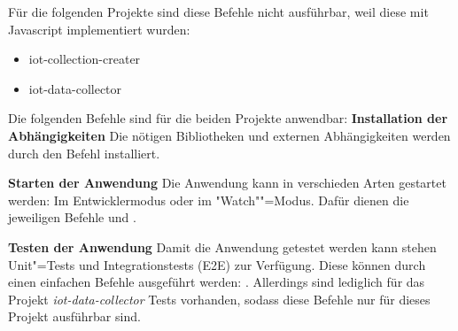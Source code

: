 Für die folgenden Projekte sind diese Befehle nicht ausführbar, weil diese mit Javascript implementiert wurden: 
\begin{itemize}
	\item iot-collection-creater
	\item iot-data-collector
\end{itemize}
Die folgenden Befehle sind für die beiden Projekte anwendbar: \newline
\textbf{Installation der Abhängigkeiten} \newline
Die nötigen Bibliotheken und externen Abhängigkeiten werden durch den Befehl  installiert.

\textbf{Starten der Anwendung}\newline
Die Anwendung kann in verschieden Arten gestartet werden: Im Entwicklermodus oder im "Watch""=Modus. Dafür dienen die jeweiligen Befehle  und .

\textbf{Testen der Anwendung}\newline
Damit die Anwendung getestet werden kann stehen Unit"=Tests und Integrationstests (E2E) zur Verfügung. 
Diese können durch einen einfachen Befehle ausgeführt werden: . Allerdings sind lediglich für das Projekt \textit{iot-data-collector} Tests vorhanden, sodass diese Befehle nur für dieses Projekt ausführbar sind. \newline


